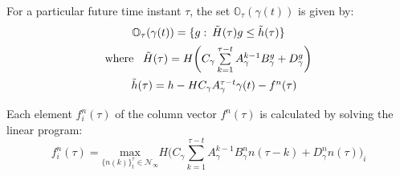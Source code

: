 \documentclass[letterpaper, 10 pt, conference]{ieeeconf}  %
\begin{document}
	For a particular future time instant $\tau$, the set $\mathbb{O}_{\tau}(\gamma(t))$ is given by:
	\begin{equation*}
	\begin{matrix}
	\mathbb{O}_{\tau}(\gamma(t)) = \{g: \hspace{2pt} \tilde{H}(\tau)g \leq \tilde{h}(\tau)\} \vspace{5pt}\\
	\text{where } \hspace{5pt} \tilde{H}(\tau) = H\bigg( C_{\gamma}\sum\limits_{k=1}^{\tau - t}A_{\gamma}^{k-1}B^g_{\gamma} + D_{\gamma}^g \bigg) \vspace{5pt} \\ \hspace{10pt}
	\tilde{h}(\tau) = h - HC_{\gamma}A_{\gamma}^{\tau - t}\gamma(t) - f^n(\tau) \vspace{5pt}
	\end{matrix} 
	\end{equation*}
	Each element $f^n_i(\tau)$ of the column vector $f^n(\tau)$ is calculated by solving the linear program:
	\begin{equation}
	f_i^n(\tau) = \underset{\{n(k)\}_{t}^{\tau}\in \mathcal{N}_{\infty}}{\text{max}} H\bigg(C_{\gamma}\sum\limits_{k=1}^{\tau - t}A_{\gamma}^{k-1}B^n_{\gamma}n(\tau-k) + D_{\gamma}^n n(\tau)\bigg)_i
	\label{RG_offline}
	\end{equation}
\end{document}
